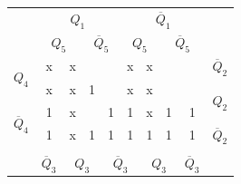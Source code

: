 \documentclass[a4paper,14pt]{article}
\begin{document}
\begin{table}[H]
\begin{minipage}{.5\linewidth}
\begin{tabular}{cccccccccc}
\end{tabular}
	\end{minipage}%
	\begin{minipage}{.5\linewidth}
		\centering
\begin{tabular}{cccccccccc}
	& \multicolumn{4}{c}{$Q_1$}                                                                         & \multicolumn{4}{c}{$\overline{Q}_1$}                                                              &                        \\
	& \multicolumn{2}{c}{$Q_5$}                       & \multicolumn{2}{c}{$\overline{Q}_5$}            & \multicolumn{2}{c}{$Q_5$}                       & \multicolumn{2}{c}{$\overline{Q}_5$}            &                        \\ \cline{2-9}
	\multicolumn{1}{c|}{\multirow{2}{*}{$Q_4$}}            & \multicolumn{1}{c|}{x} & \multicolumn{1}{c|}{x} & \multicolumn{1}{c|}{}  & \multicolumn{1}{c|}{}  & \multicolumn{1}{c|}{x} & \multicolumn{1}{c|}{x} & \multicolumn{1}{c|}{}  & \multicolumn{1}{c|}{}  & $\overline{Q}_2$       \\ \cline{2-9}
	\multicolumn{1}{c|}{}                                  & \multicolumn{1}{c|}{x} & \multicolumn{1}{c|}{x} & \multicolumn{1}{c|}{1} & \multicolumn{1}{c|}{}  & \multicolumn{1}{c|}{x} & \multicolumn{1}{c|}{x} & \multicolumn{1}{c|}{}  & \multicolumn{1}{c|}{}  & \multirow{2}{*}{$Q_2$} \\ \cline{2-9}
	\multicolumn{1}{c|}{\multirow{2}{*}{$\overline{Q}_4$}} & \multicolumn{1}{c|}{1} & \multicolumn{1}{c|}{x} & \multicolumn{1}{c|}{}  & \multicolumn{1}{c|}{1} & \multicolumn{1}{c|}{1} & \multicolumn{1}{c|}{x} & \multicolumn{1}{c|}{1} & \multicolumn{1}{c|}{1} &                        \\ \cline{2-9}
	\multicolumn{1}{c|}{}                                  & \multicolumn{1}{c|}{1} & \multicolumn{1}{c|}{x} & \multicolumn{1}{c|}{1} & \multicolumn{1}{c|}{1} & \multicolumn{1}{c|}{1} & \multicolumn{1}{c|}{1} & \multicolumn{1}{c|}{1} & \multicolumn{1}{c|}{1} & $\overline{Q}_2$       \\ \cline{2-9}
	&                        & \multicolumn{2}{c}{}                            & \multicolumn{2}{c}{}                            & \multicolumn{2}{c}{}                            &                        &                        \\
	& $\overline{Q}_3$       & \multicolumn{2}{c}{$Q_3$}                       & \multicolumn{2}{c}{$\overline{Q}_3$}            & \multicolumn{2}{c}{$Q_3$}                       & $\overline{Q}_3$       &                       
\end{tabular}
	\end{minipage} 
\end{table}
\end{document}
